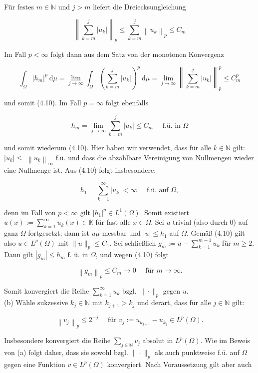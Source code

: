 \documentclass[10pt, letterpaper]{article}
\begin{document}
Für festes $m \in \mathbb{N}$ und $j>m$ liefert die Dreiecksungleichung

$$
\left\|\sum_{k=m}^{j}\left|u_{k}\right|\right\|_{p} \leq \sum_{k=m}^{j}\left\|u_{k}\right\|_{p} \leq C_{m}
$$

Im Fall $p<\infty$ folgt dann aus dem Satz von der monotonen Konvergenz

$$
\int_{\Omega}\left|h_{m}\right|^{p} \mathrm{~d} \mu=\lim _{j \rightarrow \infty} \int_{\Omega}\left(\sum_{k=m}^{j}\left|u_{k}\right|\right)^{p} \mathrm{~d} \mu=\lim _{j \rightarrow \infty}\left\|\sum_{k=m}^{j}\left|u_{k}\right|\right\|_{p}^{p} \leq C_{m}^{p}
$$

und somit (4.10). Im Fall $p=\infty$ folgt ebenfalls

$$
h_{m}=\lim _{j \rightarrow \infty} \sum_{k=m}^{j}\left|u_{k}\right| \leq C_{m} \quad \text { f.ü. in } \Omega
$$

und somit wiederum (4.10). Hier haben wir verwendet, dass für alle $k \in \mathbb{N}$ gilt: $\left|u_{k}\right| \leq$ $\left\|u_{k}\right\|_{\infty}$ f.ü. und dass die abzählbare Vereinigung von Nullmengen wieder eine Nullmenge ist. Aus (4.10) folgt insbesondere:

$$
h_{1}=\sum_{k=1}^{\infty}\left|u_{k}\right|<\infty \quad \text { f.ü. auf } \Omega,
$$

denn im Fall von $p<\infty$ gilt $\left|h_{1}\right|^{p} \in L^{1}(\Omega)$. Somit existiert $u(x):=\sum_{k=1}^{\infty} u_{k}(x) \in \mathbb{K}$ für fast alle $x \in \Omega$. Sei $u$ trivial (also durch 0) auf ganz $\Omega$ fortgesetzt; dann ist $u \mu$-messbar und $|u| \leq h_{1}$ auf $\Omega$. Gemäß (4.10) gilt also $u \in L^{p}(\Omega)$ mit $\|u\|_{p} \leq C_{1}$. Sei schließlich $g_{m}:=u-\sum_{k=1}^{m-1} u_{k}$ für $m \geq 2$. Dann gilt $\left|g_{m}\right| \leq h_{m}$ f. ü. in $\Omega$, und wegen (4.10) folgt

$$
\left\|g_{m}\right\|_{p} \leq C_{m} \rightarrow 0 \quad \text { für } m \rightarrow \infty .
$$

Somit konvergiert die Reihe $\sum_{k=1}^{\infty} u_{k}$ bzgl. $\|\cdot\|_{p}$ gegen $u$.\\
(b) Wähle sukzessive $k_{j} \in \mathbb{N}$ mit $k_{j+1}>k_{j}$ und derart, dass für alle $j \in \mathbb{N}$ gilt:

$$
\left\|v_{j}\right\|_{p} \leq 2^{-j} \quad \text { für } v_{j}:=u_{k_{j+1}}-u_{k_{j}} \in L^{p}(\Omega) .
$$

Insbesondere konvergiert die Reihe $\sum_{j \in \mathbb{N}} v_{j}$ absolut in $L^{p}(\Omega)$. Wie im Beweis von (a) folgt daher, dass sie sowohl bzgl. $\|\cdot\|_{p}$ als auch punktweise f.ü. auf $\Omega$ gegen eine Funktion $v \in L^{p}(\Omega)$ konvergiert. Nach Voraussetzung gilt aber auch
\end{document}
